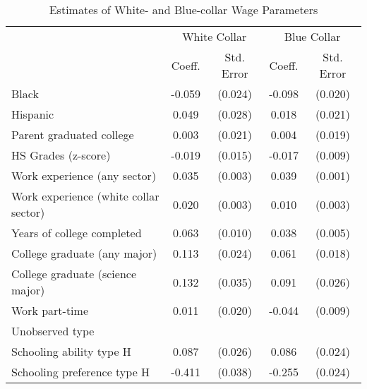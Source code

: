 \begin{table}[ht]
\caption{Estimates of White- and Blue-collar Wage Parameters}
\label{tab:WageEstimates}
\centering
\begin{threeparttable}
\begin{tabular}{lcccc}
\toprule
 & \multicolumn{2}{c}{White Collar} & \multicolumn{2}{c}{Blue Collar} \\
\cmidrule(r){2-3}\cmidrule(l){4-5}
 & Coeff.  & Std. Error  & Coeff.  & Std. Error\\
\midrule
Black & -0.059 & (0.024) & -0.098 & (0.020) \\ 
Hispanic & 0.049 & (0.028) & 0.018 & (0.021) \\ 
Parent graduated college & 0.003 & (0.021) & 0.004 & (0.019) \\ 
HS Grades (z-score) & -0.019 & (0.015) & -0.017 & (0.009) \\ 
Work experience (any sector) & 0.035 & (0.003) & 0.039 & (0.001) \\ 
Work experience (white collar sector) & 0.020 & (0.003) & 0.010 & (0.003) \\ 
Years of college completed & 0.063 & (0.010) & 0.038 & (0.005) \\ 
College graduate (any major) & 0.113 & (0.024) & 0.061 & (0.018) \\ 
College graduate (science major) & 0.132 & (0.035) & 0.091 & (0.026) \\ 
Work part-time & 0.011 & (0.020) & -0.044 & (0.009) \\ 
\midrule
Unobserved type \\ 
Schooling ability type H & 0.087 & (0.026) & 0.086 & (0.024) \\ 
Schooling preference type H & -0.411 & (0.038) & -0.255 & (0.024) \\ 

\end{tabular}
\end{threeparttable}
\end{table}
